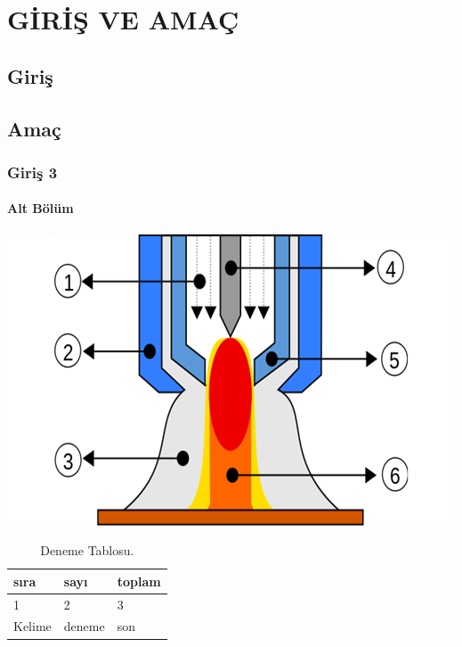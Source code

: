 \chapter{GİRİŞ VE AMAÇ}
\section{Giriş}
\lipsum
\section{Amaç}
\lipsum
\subsection{Giriş 3}
\lipsum[1-3]
\subsubsection{Alt Bölüm}

{\includegraphics[width=\textwidth]{gorseller/ptaTorc}}

\begin{table}
\centering
\caption{Deneme Tablosu.}\label{tab:den1}
\begin{tabular}{|l|l|l|}
\hline
sıra   & sayı   & toplam \\ \hline
1      & 2      & 3      \\ \hline
Kelime & deneme & son    \\ \hline
\end{tabular}
\end{table}